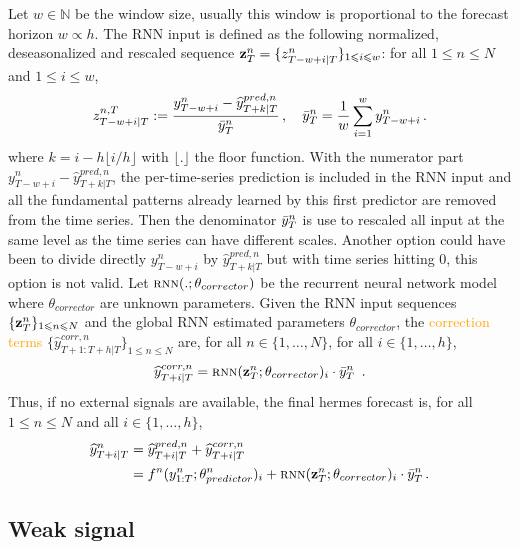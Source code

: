 \documentclass[10pt]{article} %
\newcommand{\ts}{y}
\newcommand{\tspred}{\widehat{\ts}}
\newcommand{\stat}{f}
\newcommand{\statparam}{\theta_{predictor}}
\newcommand{\lag}{h}
\newcommand{\window}{w}
\newcommand{\meants}{\Bar{\ts}}
\newcommand{\rnnwindow}{{\bf \rnninput}}
\newcommand{\rnninput}{z}
\newcommand{\rnn}{\textsc{rnn}}
\newcommand{\rnnparam}{\theta_{corrector}}
\begin{document}
Let $\window \in \mathbb{N}$ be the window size, usually this window is proportional to the forecast horizon $\window \propto \lag$. The RNN input is defined as the following  normalized, deseasonalized and rescaled sequence $\rnnwindow^n_T = \{\rnninput^{n}_{T-\window+i|T}\}_{1\leqslant i \leqslant w}$: for all $1\leqslant n \leqslant N$ and $1\leqslant i \leqslant w$,
$$
\rnninput^{n,T}_{T-w+i|T} := \frac{\ts^n_{T-w+i} -\tspred^{pred,n}_{T+k|T}}{\meants^n_T}\,,\quad \meants^n_T = \frac{1}{w}\sum_{i = 1}^{w}\ts^n_{T-w+i}\,.
$$
where $k = i - h\lfloor i/h \rfloor$ with $\lfloor. \rfloor$ the floor function. With the numerator part $\ts^n_{T-w+i} -\tspred^{pred,n}_{T+k|T}$, the per-time-series prediction is included in the RNN input and all the fundamental patterns already learned by this first predictor are removed from the time series. Then the denominator $\meants^n_T$ is use to rescaled all input at the same level as the time series can have different scales. Another option could have been to divide directly  $\ts^n_{T-w+i}$ by $\tspred^{pred,n}_{T+k|T}$ but with time series hitting 0, this option is not valid. Let $\rnn(.;\rnnparam)$ be the recurrent neural network model where $\rnnparam$ are  unknown parameters. Given the RNN input sequences $\{\rnnwindow^n_T\}_{1\leqslant n \leqslant N}$ and the global RNN estimated parameters $\rnnparam$, the \textcolor{orange}{correction terms} $\{\tspred^{corr,n}_{T+1:T+\lag|T}\}_{1\leqslant n \leqslant N}$ are, for all $n \in \{1,\ldots,N\}$, for all $i \in \{1,\ldots,\lag\}$,
$$
\tspred^{corr,n}_{T+i|T} = \rnn(\rnnwindow^n_T;\rnnparam)_i \cdot \meants^n_T\ \,.
$$
Thus, if no external signals are available, the final hermes  forecast is, for all $1\leqslant n \leqslant N$ and all $i \in \{1,\ldots,\lag\}$,
\begin{align}
\label{eq:nows:full:model}
\tspred^n_{T+i|T}  &= \tspred^{pred,n}_{T+i|T} +  \tspred^{corr,n}_{T+i|T} \\
&= \stat^n(\ts^n_{1:T};\statparam^n)_i +  \rnn(\rnnwindow^n_T;\rnnparam)_i \cdot \meants^n_T\,.\nonumber
\end{align}


\subsection{Weak signal}
\end{document}
